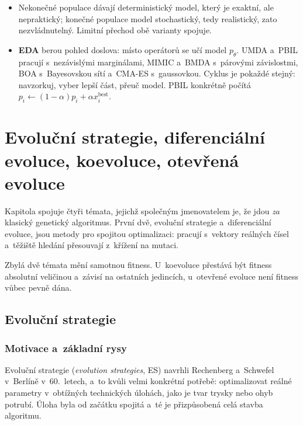 \documentclass[11pt,a4paper]{article}
\theoremstyle{definition}
\begin{document}
\begin{itemize}
  Stavů je $N = \binom{n+2^l-1}{2^l-1}$ a~matice $\mathbf{Q}$ je sice exaktní, ale
  astronomicky velká. Při $p_M>0$ je řetězec ireducibilní a~elitistický GA konverguje
  k~optimu s~pravděpodobností 1.
\item Nekonečné populace dávají deterministický model, který je exaktní, ale
  nepraktický; konečné populace model stochastický, tedy realistický, zato
  nezvládnutelný. Limitní přechod obě varianty spojuje.
\item \textbf{EDA} berou pohled  doslova: místo
  operátorů se učí model $p_\theta$. UMDA a~PBIL pracují s~nezávislými marginálami,
  MIMIC a~BMDA s~párovými závislostmi, BOA s~Bayesovskou sítí a~CMA-ES s~gaussovkou.
  Cyklus je pokaždé stejný: navzorkuj, vyber lepší část, přeuč model. PBIL konkrétně
  počítá $p_i \gets (1-\alpha)p_i + \alpha x_i^{\mathrm{best}}$.
\end{itemize}

\section{Evoluční strategie, diferenciální evoluce, koevoluce, otevřená evoluce}
\label{sec:es}

Kapitola spojuje čtyři témata, jejichž společným jmenovatelem je, že jdou \emph{za} klasický
genetický algoritmus. První dvě, evoluční strategie a~diferenciální evoluce, jsou metody pro
spojitou optimalizaci: pracují s~vektory reálných čísel a~těžiště hledání přesouvají z~křížení
na mutaci.

Zbylá dvě témata mění samotnou fitness. U~koevoluce přestává být fitness absolutní veličinou
a~závisí na ostatních jedincích, u~otevřené evoluce není fitness vůbec pevně dána.

\subsection{Evoluční strategie}
\label{ssec:es}
\subsubsection{Motivace a~základní rysy}

Evoluční strategie (\emph{evolution strategies}, ES) navrhli Rechenberg a~Schwefel v~Berlíně
v~60.\ letech, a~to kvůli velmi konkrétní potřebě: optimalizovat reálné parametry v~obtížných
technických úlohách, jako je tvar trysky nebo ohyb potrubí. Úloha byla od začátku spojitá
a~té je přizpůsobená celá stavba algoritmu.
\end{document}
